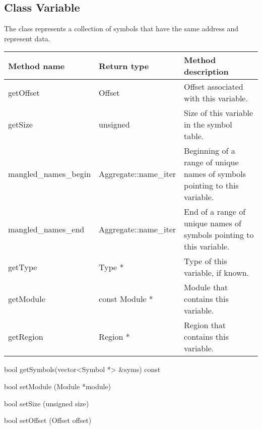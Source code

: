 \subsection{Class Variable}

The  class represents a collection of symbols that have the same address and represent data. 

\begin{tabular}{p{1.25in}p{1.125in}p{3.125in}}
\toprule
Method name & Return type & Method description \\
\midrule
getOffset & Offset & Offset associated with this variable. \\
getSize & unsigned & Size of this variable in the symbol table. \\
mangled_names_begin & Aggregate::name_iter & Beginning of a range of unique names of symbols pointing to this variable. \\
mangled_names_end & Aggregate::name_iter & End of a range of unique names of symbols pointing to this variable. \\
getType & Type * & Type of this variable, if known. \\
getModule & const Module * & Module that contains this variable. \\
getRegion & Region * & Region that contains this variable. \\
\bottomrule
\end{tabular}

\begin{apient}
bool getSymbols(vector<Symbol *> &syms) const
\end{apient}

\begin{apient}
bool setModule (Module *module)
\end{apient}

\begin{apient}
bool setSize (unsigned size)
\end{apient}

\begin{apient}
bool setOffset (Offset offset)
\end{apient}

